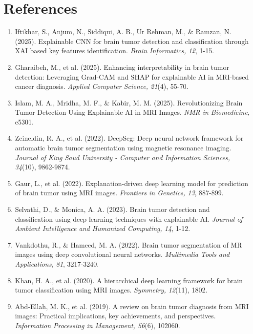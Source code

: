 
\section*{References}
\begin{enumerate}
    \item Iftikhar, S., Anjum, N., Siddiqui, A. B., Ur Rehman, M., \& Ramzan, N. (2025). Explainable CNN for brain tumor detection and classification through XAI based key features identification. \textit{Brain Informatics, 12}, 1-15.
    
    \item Gharaibeh, M., et al. (2025). Enhancing interpretability in brain tumor detection: Leveraging Grad-CAM and SHAP for explainable AI in MRI-based cancer diagnosis. \textit{Applied Computer Science, 21}(4), 55-70.
    
    \item Islam, M. A., Mridha, M. F., \& Kabir, M. M. (2025). Revolutionizing Brain Tumor Detection Using Explainable AI in MRI Images. \textit{NMR in Biomedicine}, e5301.
    
    \item Zeineldin, R. A., et al. (2022). DeepSeg: Deep neural network framework for automatic brain tumor segmentation using magnetic resonance imaging. \textit{Journal of King Saud University - Computer and Information Sciences, 34}(10), 9862-9874.
    
    \item Gaur, L., et al. (2022). Explanation-driven deep learning model for prediction of brain tumor using MRI images. \textit{Frontiers in Genetics, 13}, 887-899.
    
    \item Selvathi, D., \& Monica, A. A. (2023). Brain tumor detection and classification using deep learning techniques with explainable AI. \textit{Journal of Ambient Intelligence and Humanized Computing, 14}, 1-12.
    
    \item Vankdothu, R., \& Hameed, M. A. (2022). Brain tumor segmentation of MR images using deep convolutional neural networks. \textit{Multimedia Tools and Applications, 81}, 3217-3240.
    
    \item Khan, H. A., et al. (2020). A hierarchical deep learning framework for brain tumor classification using MRI images. \textit{Symmetry, 12}(11), 1802.
    
    \item Abd-Ellah, M. K., et al. (2019). A review on brain tumor diagnosis from MRI images: Practical implications, key achievements, and perspectives. \textit{Information Processing in Management, 56}(6), 102060.
    

\end{enumerate}

